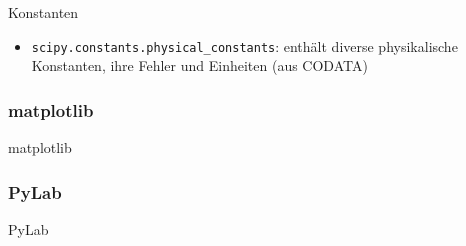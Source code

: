 \begin{frame}{Konstanten}
  \begin{itemize}
    \item \texttt{scipy.constants.physical\_constants}: enthält diverse physikalische Konstanten, ihre Fehler und Einheiten (aus CODATA)
  \end{itemize}
\end{frame}

\subsubsection{matplotlib}
\begin{frame}{matplotlib}
\end{frame}
\subsubsection{PyLab}
\begin{frame}{PyLab}
\end{frame}
